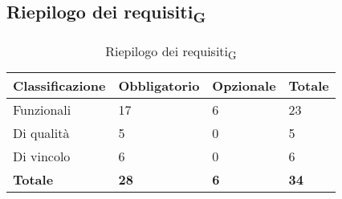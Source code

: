\subsection{Riepilogo dei requisiti\textsubscript{G}}

\begin{table}[h]
	\centering
	\begin{tabular}{| p{} | p{} | p{} | p{} |} 
		\hline
		\textbf{Classificazione} & \textbf{Obbligatorio} & \textbf{Opzionale} & \textbf{Totale} \\
		\hline
		Funzionali & 17 & 6 & 23\\
		\hline
		Di qualità & 5 & 0 & 5\\
		\hline
		Di vincolo & 6 & 0 & 6\\
		\hline
		\textbf{Totale} & \textbf{28} &\textbf {6} &  \textbf{34}\\
		\hline
	\end{tabular}
	\caption{Riepilogo dei requisiti\textsubscript{G}}
\end{table}
